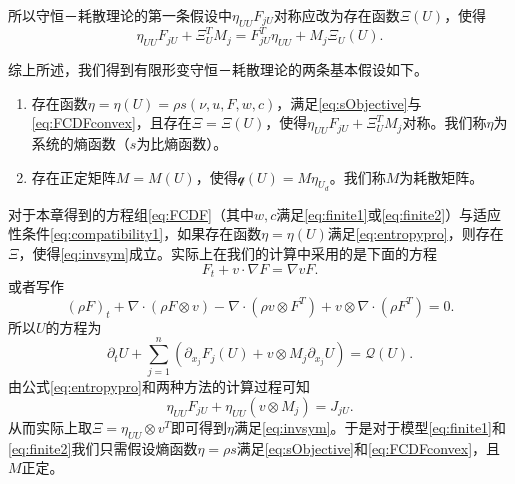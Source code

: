 所以守恒－耗散理论的第一条假设中$\eta_{UU} F_{jU}$对称应改为存在函数$\Xi(U)$，使得
\begin{equation}\label{eq:invsym}
	\eta_{UU} F_{jU} + \Xi_U^T M_j = F_{jU}^T \eta_{UU} + M_j \Xi_U(U).
\end{equation}

综上所述，我们得到有限形变守恒－耗散理论的两条基本假设如下。
\begin{enumerate}
		\item 存在函数$\eta = \eta (U) = \rho s(\nu,u,F,w,c)$，满足\eqref{eq:sObjective}与\eqref{eq:FCDFconvex}，且存在$\Xi=\Xi(U)$，使得$\eta_{UU} F_{jU} + \Xi_U^T M_j $对称。我们称$\eta$为系统的熵函数（$s$为比熵函数）。
		\item 存在正定矩阵$M = M(U)$，使得$\mathcal{q}(U) = M \eta_{U_d}$。我们称$M$为耗散矩阵。
\end{enumerate}

对于本章得到的方程组\eqref{eq:FCDF}（其中$w,c$满足\eqref{eq:finite1}或\eqref{eq:finite2}）与适应性条件\eqref{eq:compatibility1}，如果存在函数$\eta = \eta(U)$满足\eqref{eq:entropypro}，则存在$\Xi$，使得\eqref{eq:invsym}成立。实际上在我们的计算中采用的是下面的方程
\begin{equation*}
	F_t + v  \cdot \nabla F = \nabla v F.
\end{equation*}
或者写作
\begin{equation*}
(\rho F)_t + \nabla \cdot (\rho F \otimes v) - \nabla \cdot (\rho v \otimes F^T) + v \otimes \nabla \cdot (\rho F^T) = 0 .
\end{equation*}
所以$U$的方程为
\begin{equation*}
	\partial_t U + \sum_{j=1}^n (\partial_{x_j} F_j(U) + v\otimes M_j \partial_{x_j} U)= \mathcal{Q} (U) .
\end{equation*}
由公式\eqref{eq:entropypro}和两种方法的计算过程可知
\begin{equation*}
	\eta_{UU} F_{jU} + \eta_{UU} (v \otimes M_{j}) = J_{jU}.
\end{equation*}
从而实际上取$\Xi = \eta_{UU} \otimes v^T$即可得到$\eta$满足\eqref{eq:invsym}。于是对于模型\eqref{eq:finite1}和\eqref{eq:finite2}我们只需假设熵函数$\eta = \rho s$满足\eqref{eq:sObjective}和\eqref{eq:FCDFconvex}，且$M$正定。

